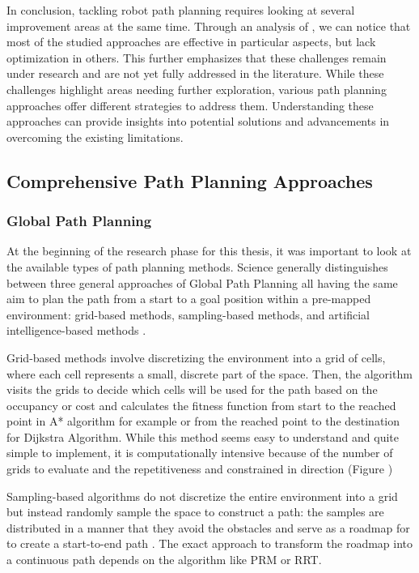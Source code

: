 In conclusion, tackling robot path planning requires looking at several improvement
areas at the same time. Through an analysis of \cite {R20}, we can notice that most of the studied approaches 
are effective in particular aspects, but lack optimization in others. This further emphasizes that these 
challenges remain under research and are not yet fully addressed in the literature. While these challenges 
highlight areas needing further exploration, various path planning approaches offer different strategies 
to address them. Understanding these approaches can provide insights into potential solutions and 
advancements in overcoming the existing limitations.


\subsection{Comprehensive Path Planning Approaches}
\subsubsection{Global Path Planning}

At the beginning of the research phase for this thesis, it was important to look at the available types 
of path planning methods. Science generally distinguishes between three general approaches of Global 
Path Planning all having the same aim to plan the path from a start to a goal position within a pre-mapped 
environment:  grid-based methods, sampling-based methods, and artificial intelligence-based methods \cite{R13}. 

Grid-based methods involve discretizing the environment into a grid of cells, where each cell represents 
a small, discrete part of the space. Then, the algorithm visits the grids to decide which cells will 
be used for the path based on the occupancy or cost and calculates the fitness function from start to 
the reached point in A* algorithm for example or from the reached point to the destination for Dijkstra 
Algorithm. While this method seems easy to understand and quite simple to implement, it is 
computationally intensive because of the number of grids to evaluate and the repetitiveness 
and constrained in direction (Figure ) 

Sampling-based algorithms do not discretize the entire environment into a grid but instead randomly sample 
the space to construct a path: the samples are distributed in a manner that they avoid the obstacles 
and serve as a roadmap for to create a start-to-end path \cite{R15}. The exact approach to transform the 
roadmap into a continuous path depends on the algorithm like PRM or RRT. 

